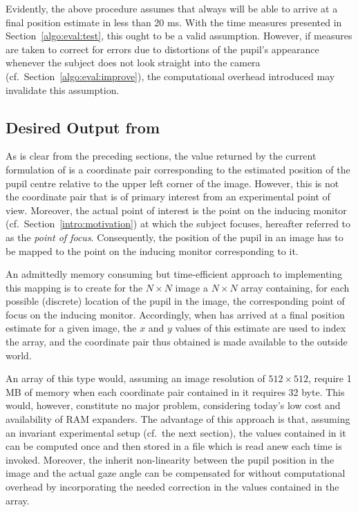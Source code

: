 Evidently, the above procedure assumes that {\octopus} always will be
able to arrive at a final position estimate in less than 20 ms.  With
the time measures presented in Section~\ref{algo:eval:test}, this
ought to be a valid assumption.  However, if measures are taken to
correct for errors due to distortions of the pupil's appearance
whenever the subject does not look straight into the camera (cf.\ 
Section~\ref{algo:eval:improve}), the computational overhead
introduced may invalidate this assumption.

\subsection{Desired Output from {\octopus}}
\label{algo:future:output}

As is clear from the preceding sections, the value returned by the
current formulation of {\octopus} is a coordinate pair corresponding
to the estimated position of the pupil centre relative to the upper
left corner of the image.  However, this is not the coordinate pair
that is of primary interest from an experimental point of view.
Moreover, the actual point of interest is the point on the inducing
monitor (cf.\ Section~\ref{intro:motivation}) at which the subject
focuses, hereafter referred to as the {\em point of focus\/}.
Consequently, the position of the pupil in an image has to be mapped
to the point on the inducing monitor corresponding to it.

An admittedly memory consuming but time-efficient approach to
implementing this mapping is to create for the $N\times N$ image a
$N\times N$ array containing, for each possible (discrete) location of
the pupil in the image, the corresponding point of focus on the
inducing monitor.  Accordingly, when {\octopus} has arrived at a final
position estimate for a given image, the $x$ and $y$ values of this
estimate are used to index the array, and the coordinate pair thus
obtained is made available to the outside world.

An array of this type would, assuming an image resolution of
$512\times 512$, require 1 MB of memory when each coordinate pair
contained in it requires 32 byte.  This would, however, constitute no
major problem, considering today's low cost and availability of RAM
expanders.  The advantage of this approach is that, assuming an
invariant experimental setup (cf.\ the next section), the values
contained in it can be computed once and then stored in a file which
is read anew each time {\octopus} is invoked.  Moreover, the inherit
non-linearity between the pupil position in the image and the actual
gaze angle can be compensated for without computational overhead by
incorporating the needed correction in the values contained in the
array.

